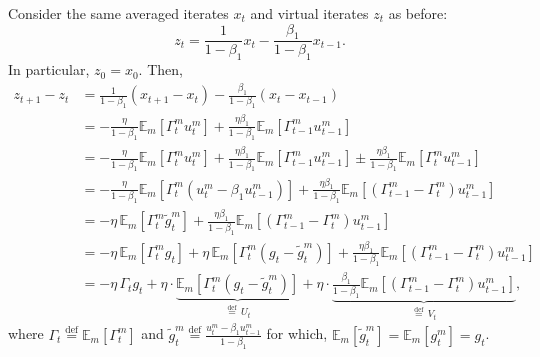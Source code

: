 Consider the same averaged iterates $x_t$ and virtual iterates $z_t$ as before:
\[
z_t = \frac{1}{1-\beta_1} x_t - \frac{\beta_1}{1-\beta_1} x_{t-1}.
\]
In particular, $z_0 = x_0$. Then,
\begin{align*}
z_{t+1} - z_t
&= \frac{1}{1-\beta_1}(x_{t+1}-x_t) - \frac{\beta_1}{1-\beta_1}(x_t - x_{t-1}) \\
&= -\frac{\eta}{1-\beta_1}\mathbb{E}_m[\Gamma_t^m u_t^m]
   + \frac{\eta\beta_1}{1-\beta_1}\mathbb{E}_m[\Gamma_{t-1}^m u_{t-1}^m] \\
&= -\frac{\eta}{1-\beta_1}\mathbb{E}_m[\Gamma_t^m u_t^m]
   + \frac{\eta\beta_1}{1-\beta_1}\mathbb{E}_m[\Gamma_{t-1}^m u_{t-1}^m]
   \pm \frac{\eta\beta_1}{1-\beta_1}\mathbb{E}_m[\Gamma_t^m u_{t-1}^m] \\
&= -\frac{\eta}{1-\beta_1}\mathbb{E}_m[\Gamma_t^m(u_t^m - \beta_1 u_{t-1}^m)]
   + \frac{\eta\beta_1}{1-\beta_1}\mathbb{E}_m[(\Gamma_{t-1}^m - \Gamma_t^m) u_{t-1}^m] \\
&= -\eta\,\mathbb{E}_m[\Gamma_t^m \widetilde{g}_t^m]
   + \frac{\eta\beta_1}{1-\beta_1}\mathbb{E}_m[(\Gamma_{t-1}^m - \Gamma_t^m) u_{t-1}^m] \\
&= -\eta\,\mathbb{E}_m[\Gamma_t^m g_t]
   + \eta\,\mathbb{E}_m[\Gamma_t^m(g_t - \widetilde{g}_t^m)]
   + \frac{\eta\beta_1}{1-\beta_1}\mathbb{E}_m[(\Gamma_{t-1}^m - \Gamma_t^m) u_{t-1}^m] \\
&= -\eta\,\Gamma_t g_t
   + \eta \cdot \underbrace{\mathbb{E}_m[\Gamma_t^m(g_t - \widetilde{g}_t^m)]}_{\stackrel{\text{def}}{=}\, U_t}
   + \eta \cdot \underbrace{\frac{\beta_1}{1-\beta_1}\mathbb{E}_m[(\Gamma_{t-1}^m - \Gamma_t^m) u_{t-1}^m]}_{\stackrel{\text{def}}{=}\, V_t},
\end{align*}
where $\Gamma_t \stackrel{\text{def}}{=} \mathbb{E}_m[\Gamma_t^m]$ and $\widetilde{g}_t^m \stackrel{\text{def}}{=} \frac{u_t^m - \beta_1 u_{t-1}^m}{1-\beta_1}$ for which, $\mathbb{E}_m[\widetilde{g}_t^m] = \mathbb{E}_m[g_t^m] = g_t$.

